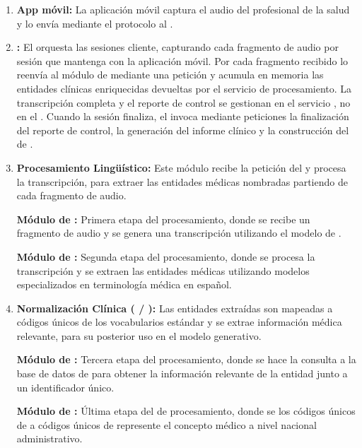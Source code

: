 \begin{enumerate}
    \item \textbf{App móvil:} La aplicación móvil captura el audio del profesional de la salud y lo envía
    mediante el protocolo  al .
    \item \textbf{:} El  orquesta las sesiones cliente, 
    capturando cada fragmento de audio por sesión que mantenga con la aplicación móvil. Por cada fragmento recibido 
    lo reenvía al módulo de  mediante una petición  y acumula en memoria
    las entidades clínicas enriquecidas devueltas por el servicio de procesamiento. La transcripción completa
    y el reporte de control se gestionan en el servicio , no en el .
    Cuando la sesión finaliza, el  invoca mediante peticiones 
    la finalización del reporte de control, la generación del informe clínico y la construcción del 
    de .
    \item \textbf{Procesamiento Lingüístico:} Este módulo recibe la petición del  y procesa la
    transcripción, para extraer las entidades médicas nombradas partiendo de cada fragmento de audio.

    \textbf{Módulo de :} Primera etapa del procesamiento, donde se recibe un fragmento de audio y
    se genera una transcripción utilizando el modelo de .

    \textbf{Módulo de :} Segunda etapa del procesamiento, donde se procesa la transcripción y se
    extraen las entidades médicas utilizando modelos  especializados en terminología médica
    en español.

    \item \textbf{Normalización Clínica ( / ):}
    Las entidades extraídas son mapeadas a códigos únicos de los vocabularios estándar y se extrae información médica relevante,
    para su posterior uso en el modelo generativo.

    \textbf{Módulo de :} Tercera etapa del procesamiento, donde se hace la consulta
    a la base de datos de  para obtener la información relevante de la entidad junto
    a un identificador único.

    \textbf{Módulo de :} Última etapa del  de procesamiento, donde
    se  los códigos únicos de  a códigos únicos de 
    represente el concepto médico a nivel nacional administrativo.


\end{enumerate}
